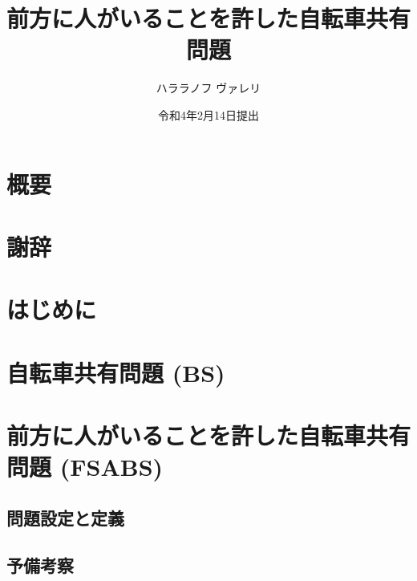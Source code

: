 \documentclass[12pt,epsf]{jreport}
\title{前方に人がいることを許した自転車共有問題}
\author{ハララノフ ヴァレリ}
\affiliation{工学部情報工学科}
\date{令和4年2月14日提出}
\begin{document}
\maketitle

\setcounter{page}{1}
\chapter*{概要}


\chapter*{謝辞}



\tableofcontents %

\chapter{はじめに}\label{chapter:introduction}
\setcounter{page}{1}   %

% 

\chapter{自転車共有問題 (BS)}\label{chapter:bs}

\chapter{前方に人がいることを許した自転車共有問題 (FSABS) }\label{chapter:fsabs}
\section{問題設定と定義}

\section{予備考察}

\end{document}
